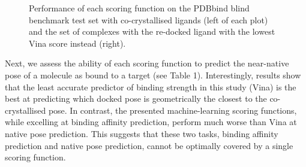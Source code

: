 \begin{figure}
\centering
{}
\caption{Performance of each scoring function on the PDBbind blind benchmark test set with co-crystallised ligands (left of each plot) and the set of complexes with the re-docked ligand with the lowest Vina score instead (right).}
\label{rfscore4:set-2-pdbbind-2012-trn-1}
\end{figure}

Next, we assess the ability of each scoring function to predict the near-native pose of a molecule as bound to a target (see Table 1). Interestingly, results show that the least accurate predictor of binding strength in this study (Vina) is the best at predicting which docked pose is geometrically the closest to the co-crystallised pose. In contrast, the presented machine-learning scoring functions, while excelling at binding affinity prediction, perform much worse than Vina at native pose prediction. This suggests that these two tasks, binding affinity prediction and native pose prediction, cannot be optimally covered by a single scoring function.

